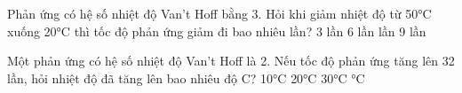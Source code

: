 \documentclass[Main.tex]{subfiles}
\begin{document}
\begin{ex}
	Phản ứng có hệ số nhiệt độ Van't Hoff bằng 3. Hỏi khi giảm nhiệt độ từ 50°C xuống 20°C thì tốc độ phản ứng giảm đi bao nhiêu lần?
	\choice
	{3 lần}
	{6 lần}
	{ lần}
	{9 lần}
\end{ex}

\begin{ex}
	Một phản ứng có hệ số nhiệt độ Van't Hoff là 2. Nếu tốc độ phản ứng tăng lên 32 lần, hỏi nhiệt độ đã tăng lên bao nhiêu độ C?
	\choice
	{10°C}
	{20°C}
	{30°C}
	{°C}
\end{ex}
\end{document}
